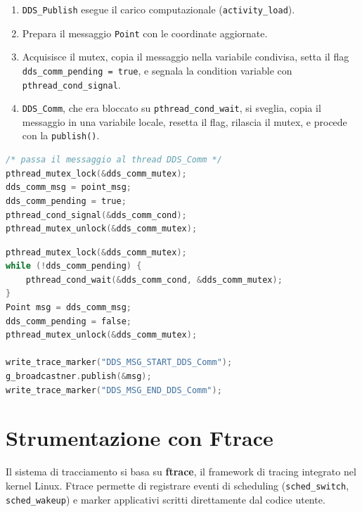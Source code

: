 \begin{enumerate}
    \item \texttt{DDS\_Publish} esegue il carico computazionale
          (\texttt{activity\_load}).
    \item Prepara il messaggio \texttt{Point} con le coordinate aggiornate.
    \item Acquisisce il mutex, copia il messaggio nella variabile condivisa,
          setta il flag \texttt{dds\_comm\_pending = true}, e segnala la
          condition variable con \texttt{pthread\_cond\_signal}.
    \item \texttt{DDS\_Comm}, che era bloccato su \texttt{pthread\_cond\_wait},
          si sveglia, copia il messaggio in una variabile locale, resetta il
          flag, rilascia il mutex, e procede con la \texttt{publish()}.
\end{enumerate}

\begin{lstlisting}[language=C, caption={Lato produttore: DDS\_Publish passa il messaggio.}, label={lst:producer}]
/* passa il messaggio al thread DDS_Comm */
pthread_mutex_lock(&dds_comm_mutex);
dds_comm_msg = point_msg;
dds_comm_pending = true;
pthread_cond_signal(&dds_comm_cond);
pthread_mutex_unlock(&dds_comm_mutex);
\end{lstlisting}

\begin{lstlisting}[language=C, caption={Lato consumatore: DDS\_Comm riceve e pubblica.}, label={lst:consumer}]
pthread_mutex_lock(&dds_comm_mutex);
while (!dds_comm_pending) {
    pthread_cond_wait(&dds_comm_cond, &dds_comm_mutex);
}
Point msg = dds_comm_msg;
dds_comm_pending = false;
pthread_mutex_unlock(&dds_comm_mutex);

write_trace_marker("DDS_MSG_START_DDS_Comm");
g_broadcastner.publish(&msg);
write_trace_marker("DDS_MSG_END_DDS_Comm");
\end{lstlisting}


\section{Strumentazione con Ftrace}
\label{sec:ftrace}

Il sistema di tracciamento si basa su \textbf{ftrace}, il framework di
tracing integrato nel kernel Linux. Ftrace permette di registrare eventi
di scheduling (\texttt{sched\_switch}, \texttt{sched\_wakeup}) e marker
applicativi scritti direttamente dal codice utente.

